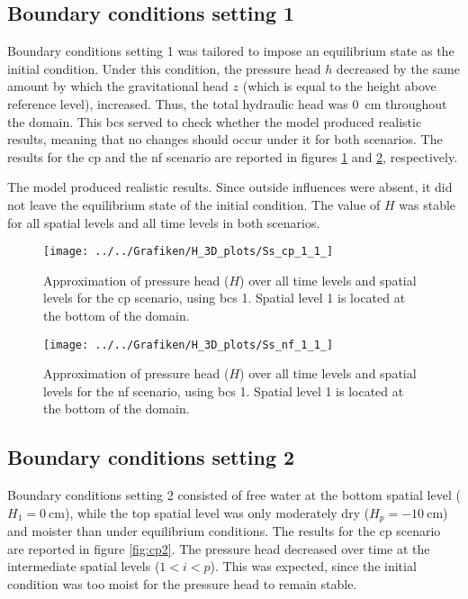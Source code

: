 \subsection{Boundary conditions setting 1}

Boundary conditions setting 1 was tailored to impose an equilibrium state as the initial condition.  Under this condition, the pressure head $h$ decreased by the same amount by which the gravitational head $z$ (which is equal to the height above reference level), increased.  Thus, the total hydraulic head was \SI{0}{\centi\meter} throughout the domain.  This bcs served to check whether the model produced realistic results, meaning that no changes should occur under it for both scenarios.  The results for the cp and the nf scenario are reported in figures \ref{fig:cp1} and \ref{fig:nf1}, respectively.

The model produced realistic results.  Since outside influences were absent, it did not leave the equilibrium state of the initial condition.  The value of $H$ was stable for all spatial levels and all time levels in both scenarios.

\begin{figure}[H]
  \centering
  \texttt{[image: ../../Grafiken/H\_3D\_plots/Ss\_cp\_1\_1\_]}
  \caption{Approximation of pressure head ($H$) over all time levels and spatial levels for the cp scenario, using bcs 1.  Spatial level 1 is located at the bottom of the domain.}
  \label{fig:cp1}
\end{figure}

\begin{figure}[H]
  \centering
  \texttt{[image: ../../Grafiken/H\_3D\_plots/Ss\_nf\_1\_1\_]}
  \caption{Approximation of pressure head ($H$) over all time levels and spatial levels for the nf scenario, using bcs 1.  Spatial level 1 is located at the bottom of the domain.}
  \label{fig:nf1}
\end{figure}

\subsection{Boundary conditions setting 2}

Boundary conditions setting 2 consisted of free water at the bottom spatial level ($H_1 = \SI{0}{\centi\meter}$), while the top spatial level was only moderately dry ($H_p = \SI{-10}{\centi\meter}$) and moister than under equilibrium conditions.  The results for the cp scenario are reported in figure \ref{fig:cp2}.  The pressure head decreased over time at the intermediate spatial levels ($1 < i < p$).  This was expected, since the initial condition was too moist for the pressure head to remain stable.

